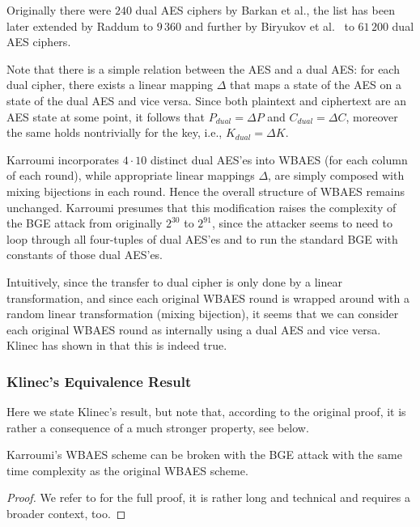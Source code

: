 	Originally there were $240$ dual AES ciphers by Barkan et al., the list has been later extended by Raddum \cite{raddum2004more} to $9\,360$ and further by Biryukov et al.\ \cite{biryukov2003toolbox} to $61\,200$ dual AES ciphers.
	
	Note that there is a simple relation between the AES and a dual AES: for each dual cipher, there exists a linear mapping $\Delta$ that maps a state of the AES on a state of the dual AES and vice versa. Since both plaintext and ciphertext are an AES state at some point, it follows that $P_{dual} = \Delta P$ and $C_{dual} = \Delta C$, moreover the same holds nontrivially for the key, i.e., $K_{dual} = \Delta K$.
	
	Karroumi incorporates $4\cdot 10$ distinct dual AES'es into WBAES (for each column of each round), while appropriate linear mappings $\Delta$, are simply composed with mixing bijections in each round. Hence the overall structure of WBAES remains unchanged. Karroumi presumes that this modification raises the complexity of the BGE attack from originally $2^{30}$ to $2^{91}$, since the attacker seems to need to loop through all four-tuples of dual AES'es and to run the standard BGE with constants of those dual AES'es.
	
	Intuitively, since the transfer to dual cipher is only done by a linear transformation, and since each original WBAES round is wrapped around with a random linear transformation (mixing bijection), it seems that we can consider each original WBAES round as internally using a dual AES and vice versa. Klinec has shown in \cite[Proposition~2]{klinec2013white} that this is indeed true.

\subsubsection{Klinec's Equivalence Result}
	
	Here we state Klinec's result, but note that, according to the original proof, it is rather a consequence of a much stronger property, see below.
	
	\begin{prop}[Klinec]
	\label{thm:dualequiv}
		Karroumi's WBAES scheme can be broken with the BGE attack with the same time complexity as the original WBAES scheme.
	\end{prop}
	
	\begin{proof}
		We refer to \cite{klinec2013white} for the full proof, it is rather long and technical and requires a broader context, too.
	\end{proof}
	
